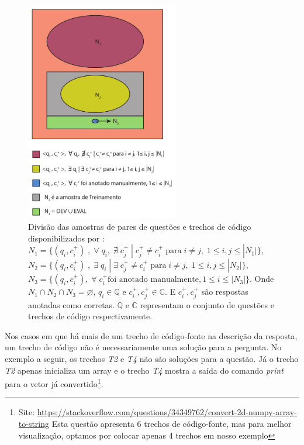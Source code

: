 \begin{figure}[h]
\includegraphics[width=0.6\textwidth]{figuras/cap-experimento/distinct-subsets-yao-sample.pdf}
\caption{Divisão das amostras de pares de questões e trechos de código disponibilizados por \cite{yao-2018}: $N_{1} = \{(q_{i}, c_{i}^{+})\;,\; \forall\; q_{i},\;\nexists\; c_{j}^{+}\; |\; c_{j}^{+} \neq c_{i}^{+}\; \text{para}\; i \neq j,\; 1 \leq i,j \leq |N_{1}| \}$, $N_{2} = \{(q_{i}, c_{i}^{+})\;,\; \exists\; q_{i}\; | \;\exists\; c_{j}^{+} \neq c_{i}^{+}\; \text{para} \; i \neq j,\; 1 \leq i,j \leq |N_{2}| \}$, $N_{3} = \{(q_{i}, c_{i}^{+}),\; \forall\; c_{i}^{+} \text{foi anotado manualmente}, 1 \leq i \leq |N_{3}| \}$. Onde $N_{1} \cap N_{2} \cap N_{3} = \varnothing$, $q_{i} \in \mathbb{Q}$ e $c_{i}^{+},  c_{j}^{+} \in \mathbb{C}$. E $c_{i}^{+}, c_{j}^{+}$ são respostas anotadas como corretas. $\mathbb{Q}$ e $\mathbb{C}$ representam o conjunto de questões e trechos de código respectivamente.} 
\label{fig:distinct-subset-python-pair-question-code}
\end{figure}

Nos casos em que há mais de um trecho de código-fonte na descrição da resposta, um trecho de código não é necessariamente uma solução para a pergunta. No exemplo a seguir, os trechos \emph{T2} e \emph{T4} não são soluções para a questão. Já o trecho \emph{T2} apenas inicializa um array e o trecho \emph{T4} mostra a saída do comando \textit{print} para o vetor já convertido\footnote{Site: \url{https://stackoverflow.com/questions/34349762/convert-2d-numpy-array-to-string} Esta questão apresenta 6 trechos de código-fonte, mas para melhor visualização, optamos por colocar apenas 4 trechos em nosso exemplo\label{foot:exemplo-stackoverflow-mais-de-um-trecho}}.



